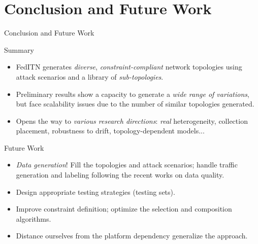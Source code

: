 \section{Conclusion and Future Work}

\begin{frame}{Conclusion and Future Work}
  \begin{block}{Summary}
    
    \begin{itemize}[<+->]
      \item FedITN generates \emph{diverse}, \emph{constraint-compliant} network topologies using attack scenarios and a library of \emph{sub-topologies}.
      \item Preliminary results show a capacity to generate a \emph{wide range of variations}, but face scalability issues due to the number of similar topologies generated. 
      \item Opens the way to \emph{various research directions}: \textit{real} heterogeneity, collection placement, robustness to drift, topology-dependent models...
    \end{itemize} 
  \end{block}

  \pause
  \begin{block}{Future Work}
    \begin{itemize}[<+->]
      \item \emph{Data generation}! Fill the topologies and attack scenarios; handle traffic generation and labeling following the recent works on data quality.
      \item Design appropriate testing strategies (testing sets).
      \item Improve constraint definition; optimize the selection and composition algorithms.
      \item Distance ourselves from the platform dependency generalize the approach.
    \end{itemize}
  \end{block}
\end{frame}

